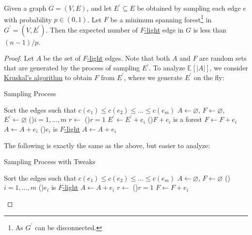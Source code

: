 \begin{lemma}\label{lma:sampling}
	Given a graph \(G=(V, E)\), and let \(E^{\prime} \subseteq E\) be obtained by sampling each edge \(e\) with probability \(p \in (0, 1)\). Let \(F\) be a minimum spanning forest\footnote{As \(G^{\prime} \) can be disconnected.} in \(G^{\prime} = (V, E^{\prime}) \). Then the expected number of \hyperref[def:light]{\(F\)-light} edge in \(G\) is less than \((n-1) / p\).
\end{lemma}
\begin{proof}
	Let \(A\) be the set of \hyperref[def:light]{\(F\)-light} edges. Note that both \(A\) and \(F\) are random sets that are generated by the process of sampling \(E^{\prime} \). To analyze \(\mathbb{E}_{}[\lvert A \rvert ] \), we consider \hyperref[algo:Kruskal]{Kruskal's algorithm} to obtain \(F\) from \(E^{\prime} \), where we generate \(E^{\prime} \) on the fly:

	\begin{algorithm}[H]
		\DontPrintSemicolon
		\caption{Sampling Process}
		\BlankLine

		Sort the edges such that \(c(e_1) \leq c(e_2) \leq \dots \leq c(e_m)\)\;
		\(A \gets \varnothing \), \(F \gets \varnothing \), \(E^{\prime} \gets \varnothing \)\;
		\For(){\(i = 1, \dots , m\)}{
			\(r \gets\)
			\uIf(){\(r = 1\)}{
				\(E^{\prime} \gets E^{\prime} + e_i\)\;
				\If(){\(F + e_i\) is a forest}{
					\(F \gets F + e_i\)\;
					\(A \gets A + e_i\)\;
				}
			}
			\ElseIf(){\(e_i\) is \hyperref[def:light]{\(F\)-light}}{
				\(A \gets A + e_i\)\;
			}
		}
		\;
	\end{algorithm}

	The following is exactly the same as the above, but easier to analyze:

	\begin{algorithm}[H]
		\DontPrintSemicolon
		\caption{Sampling Process with Tweaks}
		\BlankLine

		Sort the edges such that \(c(e_1) \leq c(e_2) \leq \dots \leq c(e_m)\)\;
		\(A \gets \varnothing \), \(F \gets \varnothing \)\;
		\For(){\(i = 1, \dots , m\)}{
			\If(){\(e_i\) is \hyperref[def:light]{\(F\)-light}}{
				\(A \gets A + e_i\)\;
				\(r \gets\)
				\If(){\(r = 1\)}{
					\(F \gets F + e_i\)\;
				}
			}
		}
		\;
	\end{algorithm}


\end{proof}
